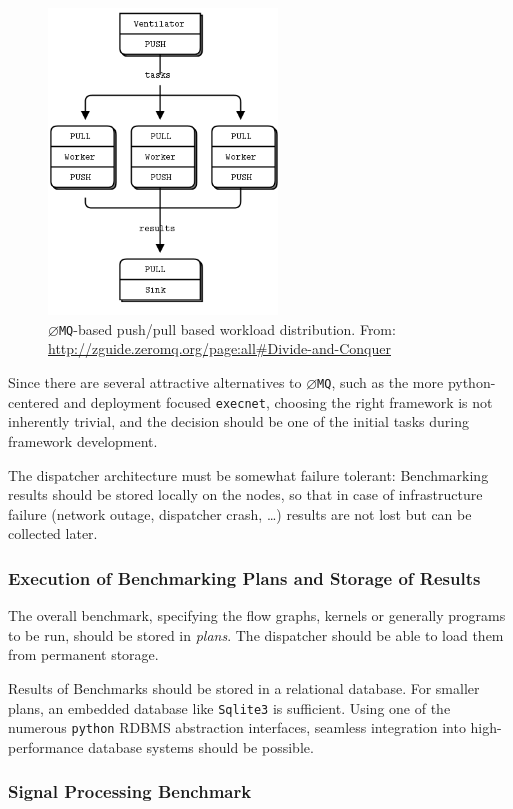 \documentclass[a4paper]{IEEEtran}
\newcommand{\zeromq}{\texttt{$\varnothing$MQ}\xspace}
\begin{document}
\begin{figure}[h] \centering \includegraphics[width=2.4in]{pushpull.png}
\caption{\label{fig:pushpull}\zeromq-based push/pull based workload
distribution. From:
\url{http://zguide.zeromq.org/page:all\#Divide-and-Conquer}} \end{figure}

Since there are several attractive alternatives to \zeromq, such as the more
python-centered and deployment focused \texttt{execnet}\cite{execnet}, choosing
the right framework is not inherently trivial, and the decision should be one
of the initial tasks during framework development.

The dispatcher architecture must be somewhat failure tolerant: Benchmarking
results should be stored locally on the nodes, so that in case of
infrastructure failure (network outage, dispatcher crash, \dots) results are
not lost but can be collected later.

\subsubsection*{Execution of Benchmarking Plans and Storage of Results}

The overall benchmark, specifying the flow graphs, kernels or generally programs 
to be run, should be stored in \emph{plans}. The dispatcher should be able to load them
from permanent storage.

Results of Benchmarks should be stored in a relational database. For smaller plans,
an embedded database like \texttt{Sqlite3} is sufficient. Using one of the numerous
\texttt{python} RDBMS abstraction interfaces, seamless integration into high-performance
database systems should be possible.

\subsubsection*{Signal Processing Benchmark}
\end{document}

